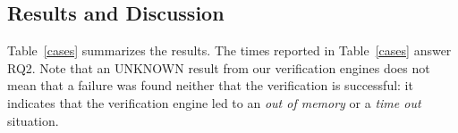 \documentclass[review]{elsarticle}
\begin{document}
\subsection{Results and Discussion}
\label{sec:results_indeed}
%
%
Table~\ref{cases} summarizes the results. The times reported in Table~\ref{cases} answer RQ2. 
Note that an UNKNOWN result from our verification engines does not mean that a failure was found neither that the verification is successful: it indicates that the verification engine led to an \textit{out of memory} or a \textit{time out} situation.
\end{document}
